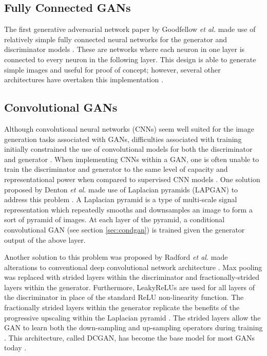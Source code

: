 \documentclass[11pt]{article}
\begin{document}
\subsection{Fully Connected GANs}
The first generative adversarial network paper by Goodfellow \textit{et al.} made use of relatively simple fully connected neural networks for the generator and discriminator models \citep{2017arXiv171007035C}. These are networks where each neuron in one layer is connected to every neuron in the following layer. This design is able to generate simple images and useful for proof of concept; however, several other architectures have overtaken this implementation \citep{2017arXiv171007035C}.

\subsection{Convolutional GANs}
Although convolutional neural networks (CNNs) seem well suited for the image generation tasks associated with GANs, difficulties associated with training initially constrained the use of convolutional models for both the discriminator and generator \citep{2017arXiv171007035C}. When implementing CNNs within a GAN, one is often unable to train the discriminator and generator to the same level of capacity and representational power when compared to supervised CNN models \citep{2017arXiv171007035C}. One solution proposed by Denton \textit{et al.} made use of Laplacian pyramids (LAPGAN) to address this problem \citep{2015arXiv150605751D}. A Laplacian pyramid is a type of multi-scale signal representation which repeatedly smooths and downsamples an image to form a sort of pyramid of images. At each layer of the pyramid, a conditional convolutional GAN (see section \ref{sec:condgan}) is trained given the generator output of the above layer.

Another solution to this problem was proposed by Radford \textit{et al.} made alterations to conventional deep convolutional network architecture \citep{2015arXiv151106434R}. Max pooling was replaced with strided layers within the discriminator and fractionally-strided layers within the generator. Furthermore, LeakyReLUs are used for all layers of the discriminator in place of the standard ReLU non-linearity function. The fractionally strided layers within the generator replicate the benefits of the progressive upscaling within the Laplacian pyramid \citep{2017arXiv171007035C}. The strided layers allow the GAN to learn both the down-sampling and up-sampling operators during training \citep{2017arXiv171007035C}. This architecture, called DCGAN, has become the base model for most GANs today \citep{2017arXiv170100160G}.
\end{document}
